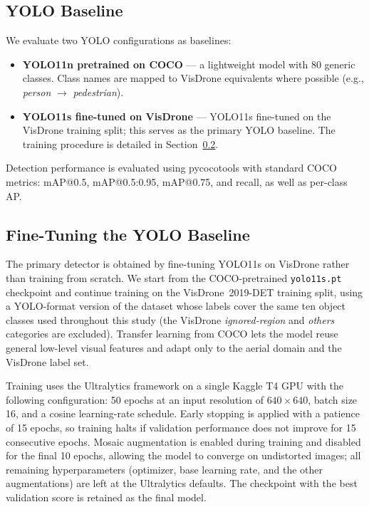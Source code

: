 \documentclass[acmtog, authorversion]{acmart}
\begin{document}
\subsection{YOLO Baseline}

We evaluate two YOLO configurations as baselines:

\begin{itemize}
  \item \textbf{YOLO11n pretrained on COCO} --- a lightweight model
    with 80 generic classes. Class names are mapped to VisDrone
    equivalents where possible (e.g., \textit{person} $\to$
    \textit{pedestrian}).
  \item \textbf{YOLO11s fine-tuned on VisDrone} --- YOLO11s fine-tuned
    on the VisDrone training split; this serves as the primary YOLO
    baseline. The training procedure is detailed in
    Section~\ref{sec:yolotrain}.
\end{itemize}

Detection performance is evaluated using pycocotools with standard
COCO metrics: mAP@0.5, mAP@0.5:0.95, mAP@0.75, and recall, as well as
per-class AP.

\subsection{Fine-Tuning the YOLO Baseline}
\label{sec:yolotrain}

The primary detector is obtained by fine-tuning YOLO11s on VisDrone
rather than training from scratch. We start from the COCO-pretrained
\texttt{yolo11s.pt} checkpoint and continue training on the
VisDrone~2019-DET training split, using a YOLO-format version of the
dataset whose labels cover the same ten object classes used throughout
this study (the VisDrone \emph{ignored-region} and \emph{others}
categories are excluded). Transfer learning from COCO lets the model
reuse general low-level visual features and adapt only to the aerial
domain and the VisDrone label set.

Training uses the Ultralytics framework on a single Kaggle T4 GPU with
the following configuration: 50 epochs at an input resolution of
$640\times640$, batch size 16, and a cosine learning-rate schedule.
Early stopping is applied with a patience of 15 epochs, so training
halts if validation performance does not improve for 15 consecutive
epochs. Mosaic augmentation is enabled during training and disabled for
the final 10 epochs, allowing the model to converge on undistorted
images; all remaining hyperparameters (optimizer, base learning rate,
and the other augmentations) are left at the Ultralytics defaults. The
checkpoint with the best validation score is retained as the final
model.
\end{document}
